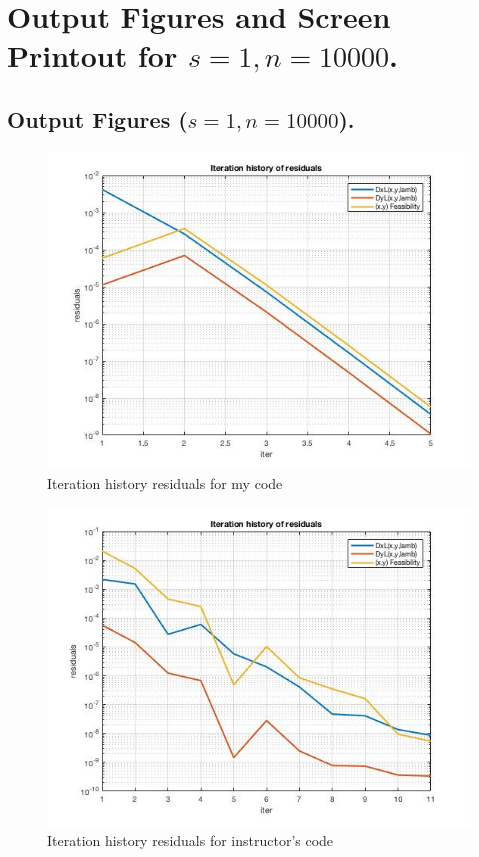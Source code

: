 \clearpage
\section{Output Figures and Screen Printout for $s=1,n=10000$.}
\subsection{Output Figures ($s=1,n=10000$).}
\begin{figure}[H]
\centering
\includegraphics[width=12cm]{F_5/F_1_2.jpg}
\caption{Iteration history residuals for my code}
\end{figure}
\begin{figure}[H]
\centering
\includegraphics[width=12cm]{F_5/F_1_3.jpg}
\caption{Iteration history residuals for instructor's code}
\end{figure}

